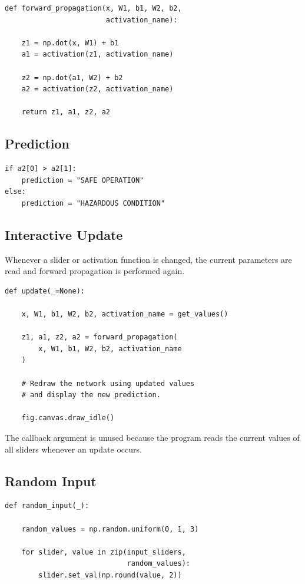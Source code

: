 \documentclass[12pt]{article}
\begin{document}
\begin{lstlisting}
def forward_propagation(x, W1, b1, W2, b2,
                        activation_name):

    z1 = np.dot(x, W1) + b1
    a1 = activation(z1, activation_name)

    z2 = np.dot(a1, W2) + b2
    a2 = activation(z2, activation_name)

    return z1, a1, z2, a2
\end{lstlisting}

\subsection{Prediction}

\begin{lstlisting}
if a2[0] > a2[1]:
    prediction = "SAFE OPERATION"
else:
    prediction = "HAZARDOUS CONDITION"
\end{lstlisting}

\subsection{Interactive Update}

Whenever a slider or activation function is changed, the current
parameters are read and forward propagation is performed again.

\begin{lstlisting}
def update(_=None):

    x, W1, b1, W2, b2, activation_name = get_values()

    z1, a1, z2, a2 = forward_propagation(
        x, W1, b1, W2, b2, activation_name
    )

    # Redraw the network using updated values
    # and display the new prediction.

    fig.canvas.draw_idle()
\end{lstlisting}

The callback argument is unused because the program reads the current
values of all sliders whenever an update occurs.

\subsection{Random Input}

\begin{lstlisting}
def random_input(_):

    random_values = np.random.uniform(0, 1, 3)

    for slider, value in zip(input_sliders,
                             random_values):
        slider.set_val(np.round(value, 2))
\end{lstlisting}
\end{document}
